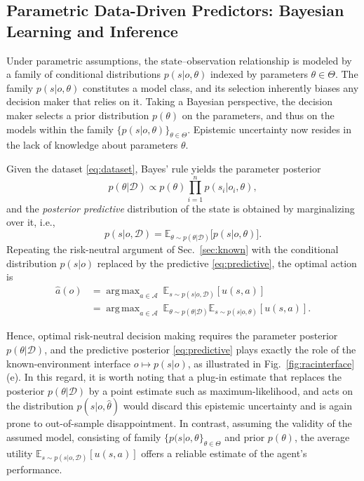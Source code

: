 \documentclass[journal]{IEEEtran}
\theoremstyle{definition}
\theoremstyle{remark}
\newcommand{\E}{\mathbb{E}}
\newcommand{\Dset}{\mathcal{D}}
\DeclareMathOperator*{\argmax}{arg\,max}
\begin{document}
\subsection{Parametric Data-Driven Predictors: Bayesian Learning and Inference}
\label{sec:par}
Under parametric assumptions, the state--observation relationship is modeled
by a family of conditional distributions $p(s| o,\theta)$ indexed by parameters $\theta\in\Theta$. { The family $p(s| o,\theta)$ constitutes a model class, and its selection inherently biases any  decision maker that relies on it.} Taking a Bayesian perspective, the decision maker selects a prior distribution $p(\theta)$ on the parameters, and thus on the models within the family $\{p(s| o,\theta) \}_{\theta \in \Theta}$. Epistemic uncertainty now resides in the
lack of knowledge about parameters $\theta$. 


Given the dataset \eqref{eq:dataset}, Bayes'
rule yields the parameter posterior
\begin{equation}
\label{eq:parampost}
p(\theta|\Dset)\propto p(\theta)\prod_{i=1}^{n} p(s_i| o_i,\theta),
\end{equation}
and the \emph{posterior predictive} distribution of the state is obtained by
marginalizing over it, i.e., 
\begin{equation}
\label{eq:predictive}
p(s| o,\Dset)=\E_{\theta \sim p(\theta|\Dset)}\!\bigl[p(s| o,\theta)\bigr].
\end{equation}
Repeating the risk-neutral argument of Sec.~\ref{sec:known} with the conditional distribution $p(s| o)$
replaced by the predictive \eqref{eq:predictive}, the optimal action is
\begin{equation}
\label{eq:bayesact}
\begin{aligned}
\hat a(o)&=\argmax_{a \in \mathcal{A}}\ \E_{s \sim p(s| o,\Dset)}[u(s,a)]\\
&=\argmax_{a\in \mathcal{A}}\ \E_{\theta \sim p(\theta|\Dset)}\E_{s\sim p(s| o,\theta)}[u(s,a)].
\end{aligned}
\end{equation}

Hence, optimal risk-neutral decision making requires the parameter posterior
$p(\theta|\Dset)$, and the
predictive posterior \eqref{eq:predictive} plays exactly the role of the
known-environment interface $o\mapsto p(s| o)$, as illustrated in Fig.~\ref{fig:racinterface}(e). In this regard, it is worth noting that a plug-in estimate
that replaces the posterior $p(\theta|\Dset)$ by a point estimate such as maximum-likelihood, and acts on the distribution $p(s| o,\hat\theta)$
would discard this epistemic uncertainty and is again prone to out-of-sample
disappointment. In contrast, assuming the validity of the assumed model, consisting of family $\{p(s|o,\theta\}_{\theta \in \Theta}$ and prior $p(\theta)$, the average utility $\E_{s \sim p(s| o,\Dset)}[u(s,a)]$ offers a reliable estimate of the agent's performance. 
\end{document}
